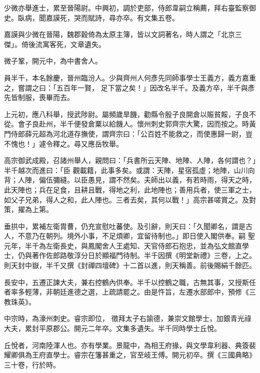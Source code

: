 \begin{pinyinscope}
 少微亦舉進士，累至晉陽尉。中興初，調於吏部，侍郎韋嗣立稱薦，拜右臺監察御史。臥病，聞嘉謨死，哭而賦詩，尋亦卒。有文集五卷。



 嘉謨與少微在晉陽，魏郡穀倚為太原主簿，皆以文詞著名，時人謂之「北京三傑」。倚後流寓客死，文章遺失。



 微子鞏，開元中，為中書舍人。



 員半千，本名餘慶，晉州臨汾人。少與齊州人何彥先同師事學士王義方，義方嘉重之，嘗謂之曰：「五百年一賢，
 足下當之矣！」因改名半千。及義方卒，半千與彥先皆制服，喪畢而去。



 上元初，應八科舉，授武陟尉。屬頻歲旱饑，勸縣令殷子良開倉以賑貧餒，子良不從。會子良赴州，半千便發倉粟以給饑人。懷州刺史郭齊宗大驚，因而按之。時黃門侍郎薛元超為河北道存撫使，謂齊宗曰：「公百姓不能救之，而使惠歸一尉，豈不愧也！」遽令釋之。尋又應岳牧舉。



 高宗御武成殿，召諸州舉人，親問曰：「兵書所云天陣、地陣、人陣，各何謂也？」半千越次而進曰：「臣
 觀載籍，此事多矣。或謂：天陣，星宿孤虛；地陣，山川向背；人陣，偏伍彌縫。以臣愚見，謂不然矣。夫師出以義，有若時雨，得天之時，此天陣也；兵在足食，且耕且戰，得地之利，此地陣也；善用兵者，使三軍之士，如父子兄弟，得人之和，此人陣也。三者去矣，其何以戰！」高宗甚嗟賞之。及對策，擢為上第。



 垂拱中，累補左衛胄曹，仍充宣慰吐蕃使。及引辭，則天曰：「久聞卿名，謂是古人，不意乃在朝列。境外小事，不足煩卿，宜留待制也。」即日使入閣供奉。嗣
 聖元年，半千為左衛長史，與鳳閣舍人王處知、天官侍郎石抱忠，並為弘文館直學士，仍與著作佐郎路敬淳分日於顯福門待制。半千因撰《明堂新禮》三卷，上之。則天封中嶽，半千又撰《封禪四壇碑》十二首以進，則天稱善。前後賜絹千餘匹。



 長安中，五遷正諫大夫，兼右控鶴內供奉。半千以控鶴之職，古無其事，又授斯任者率多輕薄，非朝廷進德之選，上疏請罷之。由是忤旨，左遷水部郎中，預修《三教珠英》。



 中宗時，為濠州刺史。睿宗即位，
 徵拜太子右諭德，兼崇文館學士，加銀青光祿大夫，累封平原郡公。開元二年卒。文集多遺失。半千同時學士丘悅。



 丘悅者，河南陸渾人也。亦有學業。景龍中，為相王府掾，與文學韋利器、典簽裴耀卿俱為王府直學士。睿宗在籓甚重之，官至岐王傅。開元初卒。撰《三國典略》三十卷，行於時。




\end{pinyinscope}
